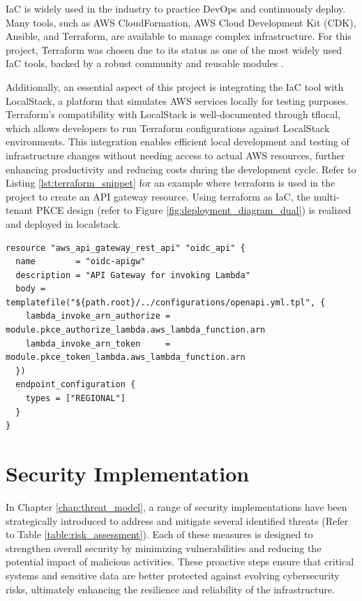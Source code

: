 IaC is widely used in the industry to practice DevOps and continuously deploy. Many tools, such as AWS CloudFormation, AWS Cloud Development Kit (CDK), Ansible, and Terraform, are available to manage complex infrastructure. For this project, Terraform was chosen due to its status as one of the most widely used IaC tools, backed by a robust community and reusable modules \citep{terraform}.

Additionally, an essential aspect of this project is integrating the IaC tool with LocalStack, a platform that simulates AWS services locally for testing purposes. Terraform's compatibility with LocalStack is well-documented through tflocal, which allows developers to run Terraform configurations against LocalStack environments. This integration enables efficient local development and testing of infrastructure changes without needing access to actual AWS resources, further enhancing productivity and reducing costs during the development cycle. Refer to Listing \ref{lst:terraform_snippet} for an example where terraform is used in the project to create an API gateway resource. Using terraform as IaC, the multi-tenant PKCE design (refer to Figure \ref{fig:deployment_diagram_dual}) is realized and deployed in localstack.

\begin{lstlisting}[caption={Terraform Code Snippet for API Gateway}, label={lst:terraform_snippet}]
resource "aws_api_gateway_rest_api" "oidc_api" {
  name        = "oidc-apigw"
  description = "API Gateway for invoking Lambda"
  body = templatefile("${path.root}/../configurations/openapi.yml.tpl", {
    lambda_invoke_arn_authorize = module.pkce_authorize_lambda.aws_lambda_function.arn
    lambda_invoke_arn_token     = module.pkce_token_lambda.aws_lambda_function.arn
  })
  endpoint_configuration {
    types = ["REGIONAL"]
  }
}
\end{lstlisting}

\section{Security Implementation}
In Chapter \ref{chap:threat_model}, a range of security implementations have been strategically introduced to address and mitigate several identified threats (Refer to Table \ref{table:risk_assessment}). Each of these measures is designed to strengthen overall security by minimizing vulnerabilities and reducing the potential impact of malicious activities. These proactive steps ensure that critical systems and sensitive data are better protected against evolving cybersecurity risks, ultimately enhancing the resilience and reliability of the infrastructure. 

